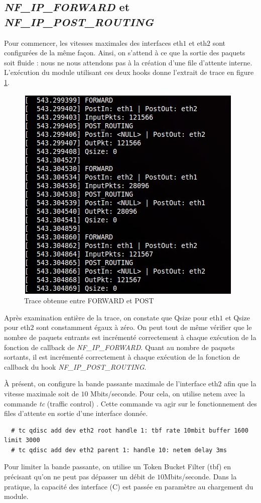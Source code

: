 \documentclass[a4paper]{article}
\begin{document}
\subsection{\textit{NF\_IP\_FORWARD} et \textit{NF\_IP\_POST\_ROUTING}}
Pour commencer, les vitesses maximales des interfaces eth$1$ et
eth$2$ sont configurées de la même façon. Ainsi, on s'attend à
ce que la sortie des paquets soit fluide : nous ne nous attendons
pas à la création d'une file d'attente interne. L'exécution du module
utilisant ces deux hooks donne l'extrait de trace en
figure \ref{forwardpost}.

\begin{figure}[!ht]
	\centering
	\includegraphics[scale=.5]{forward_post.jpg}
	\caption{\label{forwardpost} Trace obtenue entre FORWARD et POST}
\end{figure}

Après examination entière de la trace, on constate que Qsize
pour eth$1$ et Qsize pour eth$2$ sont constamment égaux à zéro.
On peut tout de même vérifier que le nombre de paquets entrants
est incrémenté correctement à chaque exécution de la fonction
de callback de \textit{NF\_IP\_FORWARD}. Quant au nombre de paquets
sortants, il est incrémenté correctement à chaque exécution de la
fonction de callback du hook \textit{NF\_IP\_POST\_ROUTING}.

À présent, on configure la bande passante maximale de l'interface
eth$2$ afin que la vitesse maximale soit de $10$ Mbits/seconde.
Pour cela, on utilise netem \cite{netem} avec la commande \textit{tc} (traffic control) \cite{tc1} \cite{tcman}.
Cette commande va agir sur le fonctionnement des files d’attente
en sortie d’une interface donnée.
\begin{verbatim}
  # tc qdisc add dev eth2 root handle 1: tbf rate 10mbit buffer 1600 limit 3000
  # tc qdisc add dev eth2 parent 1: handle 10: netem delay 3ms
\end{verbatim}
Pour limiter la bande passante, on utilise un Token Bucket Filter
(tbf) en précisant qu'on ne peut pas dépasser un débit de
$10$Mbits/seconde.
Dans la pratique, la capacité des interface (C) est passée
en paramètre au chargement du module.
\end{document}
